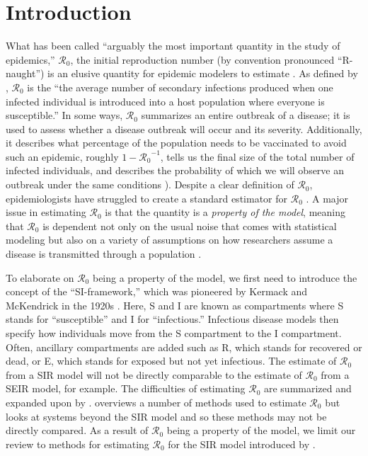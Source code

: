 \documentclass[12pt]{article}
\newcommand{\rr}{\ensuremath{\mathcal{R}_0}}
\begin{document}
\section{Introduction}\label{sec:intro}
What has been called ``arguably the most important quantity in the study of epidemics,''  $\mathcal{R}_0$, the initial reproduction number (by convention pronounced ``R-naught'') is an elusive quantity for epidemic modelers to estimate \citep{Heesterbeek2002}.  As defined by \citet{anderson1992}, $\rr$ is the ``the average number of secondary infections produced when one infected individual is introduced into a host population where everyone is susceptible.''  In some ways, $\rr$ summarizes an entire outbreak of a disease; it is used to assess whether a disease outbreak will occur and its severity.  Additionally, it describes what percentage of the population needs to be vaccinated to avoid such an epidemic, roughly $1-\rr^{-1}$, tells us the final size of the total number of infected individuals, and describes the probability of which we will observe an outbreak under the same conditions \citep{anderson1992,britton2010}).  Despite a clear definition of $\rr$, epidemiologists have struggled to create a standard  estimator for $\rr$  \citep{hethcote2000}.  A major issue in estimating $\rr$ is that the quantity is a \textit{property of the model}, meaning that $\rr$ is dependent not only on the usual noise that comes with statistical modeling but also on a variety of assumptions on how researchers assume a disease is transmitted through a population \citep{diekmann2009,brown2016}.

To elaborate on $\rr$ being a property of the model, we first need to introduce the concept of the ``SI-framework,'' which was pioneered by Kermack and McKendrick in the 1920s \citep{getz2006}.   Here, S and I are known as compartments where S stands for ``susceptible'' and I for ``infectious.'' Infectious disease models then specify how individuals move from the S compartment to the I compartment.  Often, ancillary compartments are added such as R, which stands for recovered or dead, or E, which stands for exposed but not yet infectious.  The estimate of $\rr$ from a SIR model will not be directly comparable to the estimate of $\rr$ from a SEIR model, for example.  The difficulties of estimating $\rr$ are summarized and expanded upon by \cite{li2011}.  \cite{driessche2017} overviews a number of methods used to estimate $\rr$ but looks at systems beyond the SIR model and so these methods may not be directly compared.   As a result of $\rr$ being a property of the model, we limit our review to methods for estimating $\rr$ for the SIR model introduced by \cite{Kermack700}.
\end{document}
